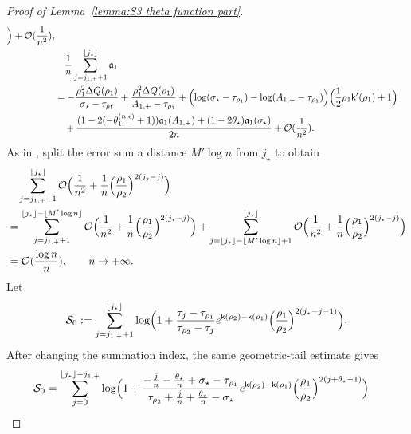 \documentclass[a4paper]{article}
\numberwithin{equation}{section}
\begin{document}
\begin{proof}[Proof of Lemma~\ref{lemma:S3 theta function part}]
\begin{align*}
\Bigr)+\mathcal{O}(\frac{1}{n^2}), 
\\
&\quad \frac{1}{n}\sum_{j=j_{1,+}+1}^{\lfloor j_{\star}\rfloor}\mathfrak{a}_1
\\
&=
-\frac{\rho_1^2\Delta Q(\rho_1)}{\sigma_{\star}-\tau_{\rho_1}}+\frac{\rho_1^2\Delta Q(\rho_1)}{A_{1,+}-\tau_{\rho_1}}
+
\Bigl(\log(\sigma_{\star}-\tau_{\rho_1})-\log(A_{1,+}-\tau_{\rho_1})\Bigr)\Bigl(\frac{1}{2}\rho_1\mathsf{k}'(\rho_1)+1\Bigr)
\\
&\quad 
+\frac{(1-2(-\theta_{1,+}^{(n,\epsilon)}+1))\mathfrak{a}_1(A_{1,+})+(1-2\theta_{\star})\mathfrak{a}_1(\sigma_{\star})}{2n}
+\mathcal{O}(\frac{1}{n^2}).
\end{align*}
As in \cite[Eq.~(3.31) and Lemma~3.6]{C2021}, split the error sum a distance $M'\log n$ from $j_\star$ to obtain
\begin{align}
\begin{split}
\label{def of error osc part1}
&\quad\sum_{j=j_{1,+}+1}^{\lfloor j_{\star}\rfloor}\mathcal{O}\Bigl(\frac{1}{n^2}+\frac{1}{n}\Bigl(\frac{\rho_1}{\rho_2}\Bigr)^{2(j_{\star}-j)}\Bigr)
\\
&=
\sum_{j=j_{1,+}+1}^{\lfloor j_{\star}\rfloor-\lfloor M'\log n\rfloor}\mathcal{O}\Bigl(\frac{1}{n^2}+\frac{1}{n}\Bigl(\frac{\rho_1}{\rho_2}\Bigr)^{2(j_{\star}-j)}\Bigr)
+
\sum_{j=\lfloor j_{\star}\rfloor-\lfloor M'\log n\rfloor+1}^{\lfloor j_{\star}\rfloor}\mathcal{O}\Bigl(\frac{1}{n^2}+\frac{1}{n}\Bigl(\frac{\rho_1}{\rho_2}\Bigr)^{2(j_{\star}-j)}\Bigr)
\\
&=
\mathcal{O}(\frac{\log n}{n}), \qquad n\to+\infty.
\end{split}    
\end{align}
Let 
\begin{equation}
\label{def of osc part1 v1}
\mathcal{S}_{0}:=\sum_{j=j_{1,+}+1}^{\lfloor j_{\star}\rfloor}\log\Bigl(1+\frac{\tau_j-\tau_{\rho_1}}{\tau_{\rho_2}-\tau_j}e^{\mathsf{k}(\rho_2)-\mathsf{k}(\rho_1)}\Bigl(\frac{\rho_1}{\rho_2} \Bigr)^{2(j_{\star}-j-1)}\Bigr).
\end{equation}
After changing the summation index, the same geometric-tail estimate gives
\begin{align}
\begin{split}
\label{def of osc part1 v2}
\mathcal{S}_0&=\sum_{j=0}^{\lfloor j_{\star}\rfloor-j_{1,+}}\log\Bigl(1+\frac{-\frac{j}{n}-\frac{\theta_{\star}}{n}+\sigma_{\star}-\tau_{\rho_1}}{\tau_{\rho_2}+\frac{j}{n}+\frac{\theta_{\star}}{n}-\sigma_{\star}}e^{\mathsf{k}(\rho_2)-\mathsf{k}(\rho_1)}\Bigl(\frac{\rho_1}{\rho_2}\Bigr)^{2(j+\theta_{\star}-1)}\Bigr)

\end{split}
\end{align}
\end{proof}
\end{document}
